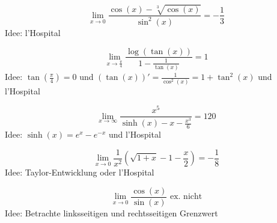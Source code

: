 \begin{displaymath}
  \lim_{x \to 0} \frac{\cos(x) - \sqrt[3]{\cos(x)}}{\sin^2(x)} = -\frac{1}{3}
\end{displaymath}
Idee: l'Hospital

\begin{displaymath}
  \lim_{x \to \frac{\pi}{4}} \frac{\log(\tan(x))}{1 - \frac{1}{\tan(x)}} = 1
\end{displaymath}
Idee: $\tan\left(\frac{\pi}{4}\right) = 0$ und $(\tan(x))' = \frac{1}{\cos^2(x)} = 1 + \tan^2(x)$ und l'Hospital

\begin{displaymath}
  \lim_{x \to \infty} \frac{x^5}{\sinh(x) - x - \frac{x^3}{6}} = 120
\end{displaymath}
Idee: $\sinh(x) = e^x - e^{-x}$ und l'Hospital

\begin{displaymath}
  \lim_{x \to 0} \frac{1}{x^2} \left(\sqrt{1 + x} - 1 - \frac{x}{2}\right) = -\frac{1}{8}
\end{displaymath}
Idee: Taylor-Entwicklung oder l'Hospital

\begin{displaymath}
  \lim_{x \to 0} \frac{\cos(x)}{\sin(x)} \text{ ex. nicht}
\end{displaymath}
Idee: Betrachte linksseitigen und rechtsseitigen Grenzwert